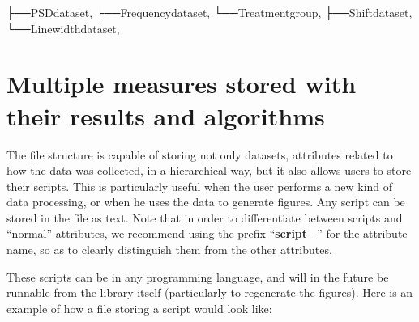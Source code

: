 \documentclass[letterpaper,10pt,english]{sphinxmanual}
\begin{document}
\begin{sphinxVerbatim}[commandchars=\\\{\}]
├──PSDdataset,
├──Frequencydataset,
└──Treatmentgroup,
├──Shiftdataset,
└──Linewidthdataset,
\end{sphinxVerbatim}


\section{Multiple measures stored with their results and algorithms}
\label{\detokenize{source/file_format:multiple-measures-stored-with-their-results-and-algorithms}}
\sphinxAtStartPar
The file structure is capable of storing not only datasets, attributes related to how the data was collected, in a hierarchical way, but it also allows users to store their scripts. This is particularly useful when the user performs a new kind of data processing, or when he uses the data to generate figures. Any script can be stored in the file as text. Note that in order to differentiate between scripts and “normal” attributes, we recommend using the prefix “{\color{red}\bfseries{}script\_}” for the attribute name, so as to clearly distinguish them from the other attributes.

\sphinxAtStartPar
These scripts can be in any programming language, and will in the future be runnable from the library itself (particularly to re\sphinxhyphen{}generate the figures). Here is an example of how a file storing a script would look like:
\end{document}
